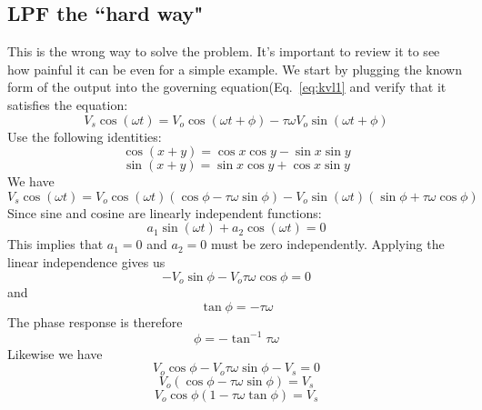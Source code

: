 \subsection{LPF the ``hard way"}
This is the wrong way to solve the problem.  It's important to review it to see how painful it can be even for a simple example.  We start by plugging the known form of the output into the governing equation(Eq.~\ref{eq:kvl1} and verify that it satisfies the equation:
    \begin{equation}
        V_s \cos(\omega t) = V_o \cos(\omega t + \phi) - \tau \omega V_o \sin(\omega t + \phi)
    \end{equation}
Use the following identities:
    \begin{equation}
        \cos(x + y) = \cos x \cos y - \sin x \sin y
    \end{equation}
    \begin{equation}
        \sin(x + y) = \sin x \cos y + \cos x \sin y
    \end{equation}
We have
    \begin{equation}
        V_s \cos(\omega t) = V_o \cos(\omega t) (\cos \phi - \tau \omega \sin\phi) - V_o \sin(\omega t) (\sin\phi + \tau \omega \cos\phi)
    \end{equation}
Since sine and cosine are linearly independent functions:
    \begin{equation}
        a_1 \sin(\omega t) + a_2 \cos(\omega t) = 0
    \end{equation}
This implies that $a_1 = 0$ and $a_2 = 0$ must be zero independently.  Applying the linear independence gives us
    \begin{equation}
        -V_o \sin\phi - V_o \tau \omega \cos \phi = 0
    \end{equation}
and
    \begin{equation}
        \tan \phi = -\tau \omega
    \end{equation}
The phase response is therefore 
    \begin{equation}
        \phi = - \tan^{-1} \tau \omega
    \end{equation}
Likewise we have
    \begin{equation}
        V_o \cos\phi - V_o \tau \omega \sin\phi - V_s = 0
    \end{equation}
    \begin{equation}
        V_o (\cos \phi - \tau \omega \sin\phi) = V_s
    \end{equation}
    \begin{equation}
        V_o \cos \phi (1  - \tau \omega \tan\phi) = V_s
    \end{equation}

